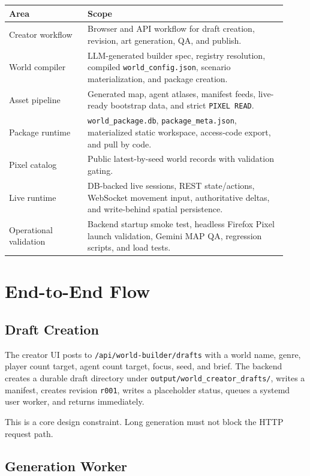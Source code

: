\documentclass[11pt]{article}
\begin{document}
\begin{longtable}{>{\raggedright\arraybackslash}p{0.26\linewidth}>{\raggedright\arraybackslash}p{0.66\linewidth}}
\textbf{Area} & \textbf{Scope} \\
\hline
Creator workflow & Browser and API workflow for draft creation, revision, art generation, QA, and publish. \\
World compiler & LLM-generated builder spec, registry resolution, compiled \texttt{world\_config.json}, scenario materialization, and package creation. \\
Asset pipeline & Generated map, agent atlases, manifest feeds, live-ready bootstrap data, and strict \texttt{PIXEL READ}. \\
Package runtime & \texttt{world\_package.db}, \texttt{package\_meta.json}, materialized static workspace, access-code export, and pull by code. \\
Pixel catalog & Public latest-by-seed world records with validation gating. \\
Live runtime & DB-backed live sessions, REST state/actions, WebSocket movement input, authoritative deltas, and write-behind spatial persistence. \\
Operational validation & Backend startup smoke test, headless Firefox Pixel launch validation, Gemini MAP QA, regression scripts, and load tests. \\
\end{longtable}

\section{End-to-End Flow}

\subsection{Draft Creation}

The creator UI posts to \texttt{/api/world-builder/drafts} with a world name, genre, player count target, agent count target, focus, seed, and brief. The backend creates a durable draft directory under \texttt{output/world\_creator\_drafts/}, writes a manifest, creates revision \texttt{r001}, writes a placeholder status, queues a systemd user worker, and returns immediately.

This is a core design constraint. Long generation must not block the HTTP request path.

\subsection{Generation Worker}
\end{document}

